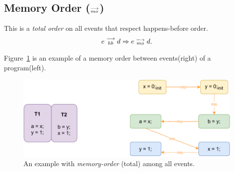     \subsection{Memory Order ($\stackrel{\longrightarrow}{_{mo}}$)}
        This is a \textit{total order} on all events that respect happens-before order\footnotemark. 
        \begin{align*}
            e\stackrel{\longrightarrow}{_{hb}}d \Rightarrow{} e\stackrel{\longrightarrow}{_{mo}}d.    
        \end{align*}

        
        Figure~\ref{model:memory-order} is an example of a memory order between events(right) of a program(left).
        \begin{figure}[H]
            \centering
            \includegraphics[scale=0.7]{3.ECMAScriptMemoryModel/MemoryOrder.pdf}
            \caption{An example with \textit{memory-order} (total) among all events.}
            \label{model:memory-order}
        \end{figure}
